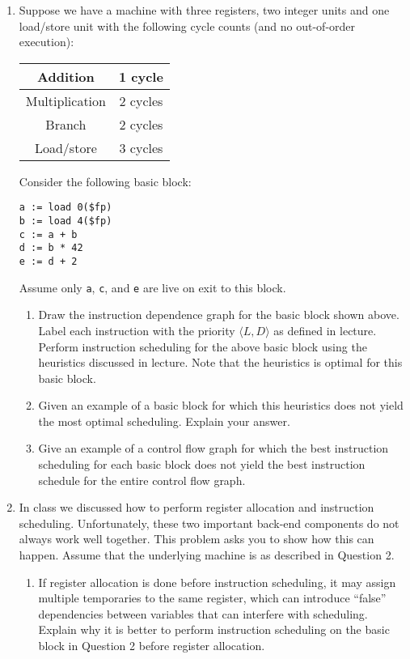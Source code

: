 \documentclass{article}
\begin{document}
\begin{enumerate}
\item Suppose we have a machine with three registers, two integer units and
one load/store unit with the following cycle counts (and no
out-of-order execution):
\begin{center}
\begin{tabular}{|c|c|} \hline
Addition & 1 cycle \\ \hline
Multiplication & 2 cycles \\ \hline
Branch & 2 cycles \\ \hline
Load/store & 3 cycles \\ \hline
\end{tabular}
\end{center}
Consider the following basic block:
\begin{verbatim}
a := load 0($fp)
b := load 4($fp)
c := a + b
d := b * 42
e := d + 2
\end{verbatim}
Assume only \texttt{a}, \texttt{c}, and \texttt{e} are live on exit to
this block.  

\begin{enumerate} 
\item Draw the instruction dependence graph for the basic
  block shown above. Label each instruction with
  the priority $\langle L,D \rangle$ as defined in
  lecture. Perform instruction scheduling for the above basic block using
  the heuristics discussed in lecture. Note that the heuristics is
  optimal for this basic block.
\item Given an example of a basic block for which this heuristics does
  not yield the most optimal scheduling. Explain your answer. 
\item Give an example of a control flow graph for which the best
  instruction scheduling for each basic block does not yield the best
  instruction schedule for the entire control flow graph. 
\end{enumerate}

\item In class we discussed how to perform register allocation and
instruction scheduling.  Unfortunately, these two important back-end
components do not always work well together.  This problem asks you to
show how this can happen. Assume that the underlying machine is as described in
Question 2.
\begin{enumerate}

\item If register allocation is done before instruction scheduling, it
may assign multiple temporaries to the same register, which can
introduce ``false'' dependencies between variables that can
interfere with scheduling.  Explain why it is better to perform instruction
scheduling on the basic block in Question 2 before register allocation.



\end{enumerate}
\end{enumerate}
\end{document}
